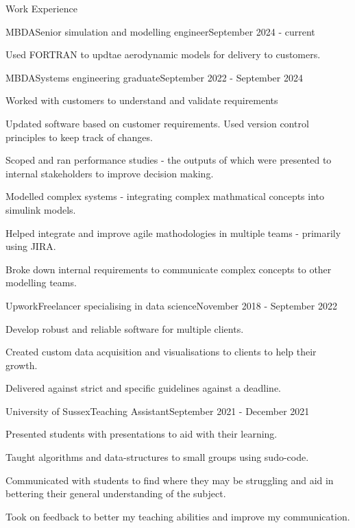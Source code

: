 \documentclass[a4paper]{article}
\newlength{\tabin}
\newlength{\secsep}
\newcommand{\lineunder}{\vspace*{-8pt} \\ \hspace*{-6pt} \hrulefill \\ \vspace*{-15pt}}
\newenvironment{tabbedsection}[1]{
  \begin{list}{}{
      \setlength{\itemsep}{0pt}
      \setlength{\labelsep}{0pt}
      \setlength{\labelwidth}{0pt}
      \setlength{\leftmargin}{\tabin}
      \setlength{\rightmargin}{\tabin}
      \setlength{\listparindent}{0pt}
      \setlength{\parsep}{0pt}
      \setlength{\parskip}{0pt}
      \setlength{\partopsep}{0pt}
      \setlength{\topsep}{#1}
    }
  \item[]
}{\end{list}}
\newenvironment{resume_section}[1]{
  \filbreak
  \vspace{2\secsep}
  \textsc{\large#1}
  \lineunder
  \begin{tabbedsection}{\secsep}
}{\end{tabbedsection}}
\newenvironment{resume_employer}[4]{
  \vspace{\secsep}
  \textbf{#1} \\ 
  \indent {\small #2} \hfill {\footnotesize#3 (#4)}
  \begin{tabbedsection}{0pt}
  \begin{subitems}
}{\end{subitems}\end{tabbedsection}}
\newenvironment{subitems}{
  \renewcommand{\labelitemi}{-}
  \begin{itemize}
      \setlength{\labelsep}{1em}
}{\end{itemize}}
\begin{document}
\begin{resume_section}{Work Experience}
  \begin{resume_employer}{MBDA}{Senior simulation and modelling engineer}{}{September 2024 - current}
    \item Used FORTRAN to updtae aerodynamic models for delivery to customers.
  \end{resume_employer}

  \begin{resume_employer}{MBDA}{Systems engineering graduate}{}{September 2022 - September 2024}
    \item Worked with customers to understand and validate requirements
    \item Updated software based on customer requirements. Used version control principles to keep track of changes.
    \item Scoped and ran performance studies - the outputs of which were presented to internal stakeholders to improve decision making.
    \item Modelled complex systems - integrating complex mathmatical concepts into simulink models.
    \item Helped integrate and improve agile mathodologies in multiple teams - primarily using JIRA.
    \item Broke down internal requirements to communicate complex concepts to other modelling teams.
  \end{resume_employer}

  \begin{resume_employer}{Upwork}{Freelancer specialising in data science}{}{November 2018 - September 2022}
    \item Develop robust and reliable software for multiple clients.
    \item Created custom data acquisition and  visualisations to clients to help their growth.
    \item Delivered against strict and specific guidelines against a deadline.
  \end{resume_employer}
  
    \begin{resume_employer}{University of Sussex}{Teaching Assistant}{}{September 2021 - December 2021}
    \item Presented students with presentations to aid with their learning.
    \item Taught algorithms and data-structures to small groups using sudo-code.
    \item Communicated with students to find where they may be struggling and aid in bettering their general understanding of the subject.
    \item Took on feedback to better my teaching abilities and improve my communication.
  \end{resume_employer}
  
\end{resume_section}
\end{document}
